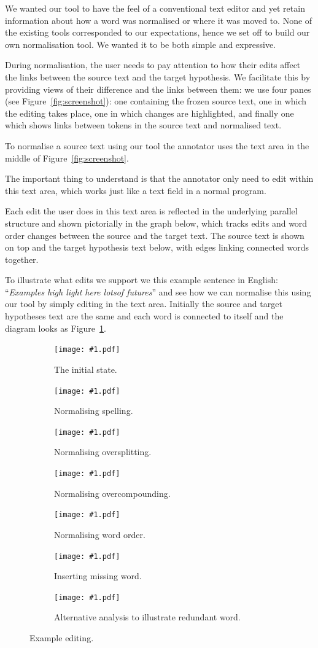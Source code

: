 \documentclass[10pt, a4paper]{article}
\begin{document}
We wanted our tool to have the feel of a conventional text editor and yet retain
information about how a word was normalised or where it was moved to. None of
the existing tools corresponded to our expectations, hence we set off to build
our own normalisation tool. We wanted it to be both simple and expressive.

During normalisation, the user needs to pay attention to how their edits affect
the links between the source text and the target hypothesis. We facilitate
this by providing views of their difference and the links between them:
we use four panes (see Figure~\ref{fig:screenshot}): one containing the
frozen source text, one in which the editing takes place, one in which
changes are highlighted, and finally one which shows links between tokens in the source text and normalised text.

To normalise a source text using our tool the annotator uses
the text area in the middle of Figure~\ref{fig:screenshot}.

The important thing to understand is that the annotator only need to edit
within this text area, which works just like a text field in a normal program.

Each edit the user does in this text area is reflected in the underlying
parallel structure and shown pictorially in the graph below, which tracks
edits and word order changes between the source and the target text.
The source text is shown on top and the target hypothesis text below, with
edges linking connected words together.

To illustrate what edits we support we this example sentence in English:
``\emph{Examples high light here lotsof futures}''
and see how we can normalise this using our tool by simply editing in
the text area.  Initially the source and target hypotheses text are
the same and each word is connected to itself and the diagram looks as
Figure~\ref{fig:features0}.

\begin{figure}
\centering
\newcommand{\features}[2]{
\begin{subfigure}[t]{0.5\textwidth}
\texttt{[image: \#1.pdf]}
\caption{#2 \label{fig:#1}}
\end{subfigure}
}

\features{features0}{The initial state.}
\features{features1}{Normalising spelling.}
\features{features2}{Normalising oversplitting.}
\features{features3}{Normalising overcompounding.}
\features{features4}{Normalising word order.}
\features{features5}{Inserting missing word.}
\features{features6}{Alternative analysis to illustrate redundant word.}
\caption{Example editing.}
\end{figure}
\end{document}
